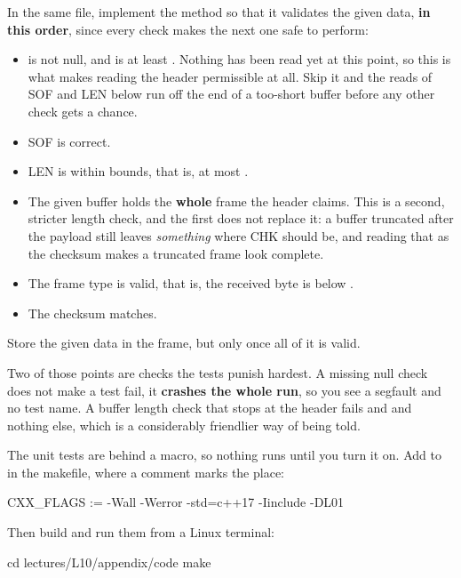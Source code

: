 In the same file, implement the method  so that it validates the
given data, \textbf{in this order}, since every check makes the next one safe to perform:
\begin{itemize}
  \item {} is not null, and  is at least . Nothing has been
    read yet at this point, so this is what makes reading the header permissible at all. Skip it and
    the reads of SOF and LEN below run off the end of a too-short buffer before any other check gets
    a chance.
  \item SOF is correct.
  \item LEN is within bounds, that is, at most .
  \item The given buffer holds the \textbf{whole} frame the header claims. This is a second, stricter
    length check, and the first does not replace it: a buffer truncated after the payload still
    leaves \emph{something} where CHK should be, and reading that as the checksum makes a truncated
    frame look complete.
  \item The frame type is valid, that is, the received byte is below .
  \item The checksum matches.
\end{itemize}

Store the given data in the frame, but only once all of it is valid.

Two of those points are checks the tests punish hardest. A missing null check does not make a test
fail, it \textbf{crashes the whole run}, so you see a segfault and no test name. A buffer length
check that stops at the header fails  and
 and nothing else, which is a considerably friendlier way of
being told.

The unit tests are behind a macro, so nothing runs until you turn it on. Add  to
 in the makefile, where a  comment marks the place:

\begin{makecode}
CXX_FLAGS := -Wall -Werror -std=c++17 -Iinclude -DL01
\end{makecode}

Then build and run them from a Linux terminal:

\begin{shell}
cd lectures/L10/appendix/code
make
\end{shell}

